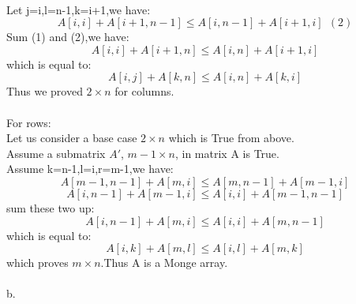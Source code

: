 \documentclass[11pt]{article}
\begin{document}
\\Let j=i,l=n-1,k=i+1,we have:
$$A[i,i]+A[i+1,n-1]\leq A[i,n-1]+A[i+1,i]\ \ (2)$$
Sum (1) and (2),we have:
$$A[i,i]+A[i+1,n]\leq A[i,n]+A[i+1,i]$$
which is equal to:
$$A[i,j]+A[k,n] \leq A[i,n]+A[k,i]$$
Thus we proved $2 \times n$ for columns.
\\
\\For rows:
\\Let us consider a base case $2 \times n$ which is True from above.
\\Assume a submatrix $A'$, $m-1 \times n$, in matrix A is True.
\\Assume k=n-1,l=i,r=m-1,we have:
$$A[m-1,n-1]+A[m,i]\leq A[m,n-1]+A[m-1,i]$$
$$A[i,n-1]+A[m-1,i]\leq A[i,i]+A[m-1,n-1]$$
sum these two up:
$$A[i,n-1]+A[m,i]\leq A[i,i]+A[m,n-1]$$
which is equal to:
$$A[i,k]+A[m,l]\leq A[i,l]+A[m,k]$$
which proves $m \times n$.Thus A is a Monge array.
\\
\\b.
\end{document}
